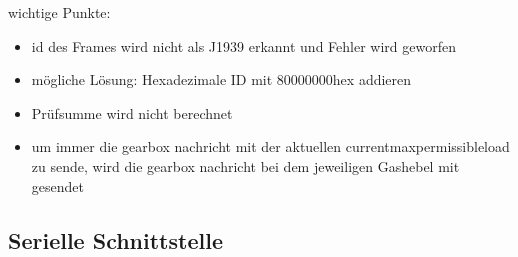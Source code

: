 wichtige Punkte:
\begin{itemize}
    \item id des Frames wird nicht als J1939 erkannt und Fehler wird geworfen
    \item mögliche Lösung: Hexadezimale ID mit 80000000hex addieren
    \item Prüfsumme wird nicht berechnet
    \item um immer die gearbox nachricht mit der aktuellen currentmaxpermissibleload zu sende, wird die gearbox nachricht bei dem jeweiligen Gashebel mit gesendet
\end{itemize}


\subsection{Serielle Schnittstelle}

